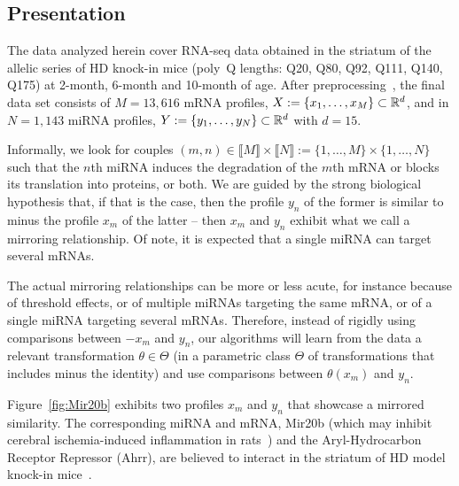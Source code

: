 \subsection{Presentation}

The data  analyzed herein cover RNA-seq  data obtained in the  striatum of the
allelic series of HD knock-in mice (poly~Q lengths: Q20, Q80, Q92, Q111,
Q140,   Q175)   at   2-month,   6-month    and   10-month   of   age.    After
preprocessing~\cite[][Methods section]{megret:inserm-02512089}, the final data
set      consists      of      $M      =      13,616$      mRNA      profiles,
$X := \{x_{1},  \ldots, x_{M} \} \subset  \mathbb{R}^{d}$, and in $N  = 1,143$ miRNA
profiles, $Y := \{y_{1}, \ldots, y_{N}\} \subset \mathbb{R}^{d}$ with $d= 15$.

Informally,            we           look            for           couples
  $(m,        n)\in\llbracket       M\rrbracket        \times       \llbracket
  N\rrbracket:=\{1,\ldots,M\} \times \{1,\ldots,N\}$ such that the $n$th miRNA
  induces the  degradation of the  $m$th mRNA  or blocks its  translation into
  proteins, or both.  We are guided  by the strong biological hypothesis that,
  if that is  the case, then the  profile $y_{n}$ of the former  is similar to
  minus the profile $x_{m}$ of the  latter -- then $x_{m}$ and $y_{n}$ exhibit
  what  we call  a mirroring  relationship.  Of  note, it  is expected  that a
  single miRNA can target several mRNAs.

The  actual  mirroring relationships  can  be  more  or less  acute,  for
  instance because of  threshold effects, or of multiple  miRNAs targeting the
  same mRNA, or of a single miRNA targeting several mRNAs.  Therefore, instead
  of rigidly  using comparisons between  $-x_{m}$ and $y_{n}$,  our algorithms
  will learn from  the data a relevant transformation  $\theta\in\Theta$ (in a
  parametric  class  $\Theta$  of  transformations  that  includes  minus  the
  identity) and use comparisons between $\theta(x_{m})$ and $y_{n}$.

Figure~\ref{fig:Mir20b}  exhibits  two  profiles   $x_{m}$  and  $y_{n}$  that
showcase  a mirrored  similarity.  The  corresponding miRNA  and mRNA,  Mir20b
(which    may    inhibit    cerebral    ischemia-induced    inflammation    in
rats~\cite{ZWDSL19}) and  the Aryl-Hydrocarbon Receptor Repressor  (Ahrr), are
believed   to    interact   in   the    striatum   of   HD    model   knock-in
mice~\cite{megret:inserm-02512089}.

